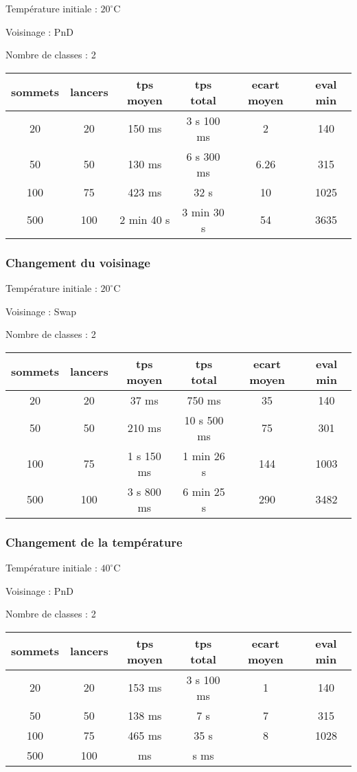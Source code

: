 \documentclass[12pt]{article}
\begin{document}
\bigskip
Température initiale : $20^\circ$C

Voisinage : PnD

Nombre de classes : 2
\bigskip

\begin{tabular}{|c|c|c|c|c|c|}
	\hline 
	sommets & lancers & tps moyen & tps total & ecart moyen & eval min\\
	\hline
	20 & 20 & 150 ms & 3 s 100 ms & 2 & 140 \\
	\hline
	 50  &  50  &   130  ms   &   6 s  300  ms   &   6.26  &   315  \\
	\hline
	 100  &  75  &   423  ms   &  32 s  &  10   &   1025  \\
	\hline
	 500  &  100  &  2 min 40 s  &  3 min 30  s &  54   &   3635  \\
	\hline
\end{tabular}
\bigskip

\subsubsection*{Changement du voisinage}

Température initiale : $20^\circ$C

Voisinage : Swap

Nombre de classes : 2
\bigskip

\begin{tabular}{|c|c|c|c|c|c|}
	\hline 
	sommets & lancers & tps moyen & tps total & ecart moyen & eval min\\
	\hline
	20 & 20 & 37 ms & 750 ms & 35 & 140 \\
	\hline
	 50  &  50  &   210  ms   &   10 s  500  ms   &  75   &   301  \\
	\hline
	 100  &  75  & 1 s 150  ms   &  1 min 26 s &  144   &   1003  \\
	\hline
	 500  &  100  & 3 s 800  ms  &  6 min 25  s &   290  &   3482  \\
	\hline
\end{tabular}
\bigskip

\subsubsection*{Changement de la température}

Température initiale : $40^\circ$C

Voisinage : PnD

Nombre de classes : 2

\bigskip
\begin{tabular}{|c|c|c|c|c|c|}
	\hline 
	sommets & lancers & tps moyen & tps total & ecart moyen & eval min\\
	\hline
	20 & 20 & 153 ms & 3 s 100 ms & 1 & 140 \\
	\hline
	 50  &  50  & 138 ms   &  7  s  &   7  & 315\\
	\hline
	 100  &  75  &   465  ms   &  35 s &   8  &  1028   \\
	\hline
	 500  &  100  &      ms  &    s    ms   &     &     \\
	\hline
\end{tabular}
\bigskip
\end{document}
